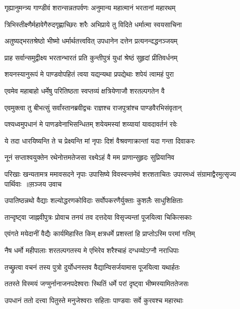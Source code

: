 \twolineshloka
{गृह्यानुमन्त्र्य गाण्डीवं शरान्सन्नतपर्वणः}
{अनुमान्य महात्मानं भरतानां महारथम्}


\twolineshloka
{त्रिभिस्तीक्ष्णैर्महावेगैरुदगृह्णाच्छिरः शरैः}
{अभिप्राये तु विदिते धर्मात्मा स्वयसाचिना}


\twolineshloka
{अतुष्यद्भरतश्रेष्ठो भीष्मो धर्मार्थतत्त्ववित्}
{उपधानेन दत्तेन प्रत्यनन्दद्धनञ्जयम्}


\twolineshloka
{प्राह सर्वान्समुद्वीक्ष्य भरतान्भारतं प्रति}
{कुन्तीपुत्रं युधां श्रेष्ठं सुहृदां प्रीतिवर्धनम्}


\twolineshloka
{शयनस्यानुरूपं मे पाण्डवोपहितं त्वया}
{यद्यन्यथा प्रपद्येथाः शपेयं त्वामहं पुरा}


\twolineshloka
{एवमेव महाबाहो धर्मेषु परितिष्ठता}
{स्वप्तव्यं क्षत्रियेणाजौ शरतल्पगतेन वै}


\twolineshloka
{एवमुक्त्वा तु बीभत्सुं सर्वांस्तानब्रवीद्वचः}
{राज्ञश्च राजपुत्रांश्च पाण्डवैरभिसंवृतान्}


\twolineshloka
{पश्यध्वमुपधानं मे पाणडवेनाभिसन्धितम्}
{शयेयमस्यां शय्यायां यावदावर्तनं रवेः}


\twolineshloka
{ये तदा धारयिष्यन्ति ते च प्रेक्ष्यन्ति मां नृपाः}
{दिशं वैश्रवणाक्रान्तां यदा गन्ता दिवाकरः}


\twolineshloka
{नूनं सप्ताश्वयुक्तेन रथेनोत्तमतेजसा}
{रक्ष्येऽहं वै मम प्राणान्सुहृदः सुप्रियानिव}


\fourlineindentedshloka
{परिखाः खन्यतामत्र ममावसदने नृपाः}
{उपासिष्ये विवस्वन्तमेवं शरशताचितः}
{उपारमध्वं संग्रामाद्वैरमुत्सृज्य पार्थिवाः ॥स़ञ्जय उवाच}
{}


\twolineshloka
{उपातिष्ठन्नथो वैद्याः शल्योद्धरणकोविदाः}
{सर्वोपकरणैर्युक्ताः कुशलैः साधुशिक्षिताः}


\twolineshloka
{तान्दृष्ट्वा जाह्नवीपुत्रः प्रोवाच तनयं तव}
{दत्तदेया विसृज्यन्तां पूजयित्वा चिकित्सकाः}


\twolineshloka
{एवंगते मयेदानीं वैद्यैः कार्यमिहास्ति किम्}
{क्षत्रधर्मे प्रशस्तां हि प्राप्तोऽस्मि परमां गतिम्}


\twolineshloka
{नैष धर्मो महीपालाः शरतल्पगतस्य मे}
{एभिरेव शरैश्चाहं दग्धव्योऽग्नौ नराधिपाः}


\twolineshloka
{तच्छ्रुत्वा वचनं तस्य पुत्रो दुर्योधनस्तव}
{वैद्यान्विसर्जयामास पूजयित्वा यथार्हतः}


\twolineshloka
{ततस्ते विस्मयं जग्मुर्नानाजनपदेश्वराः}
{स्थितिं धर्मे परां दृष्ट्वा भीष्मस्यामिततेजसः}


\twolineshloka
{उपधानं ततो दत्त्वा पितुस्ते मनुजेश्वराः}
{सहिताः पाण्डवाः सर्वे कुरवश्च महारथाः}



